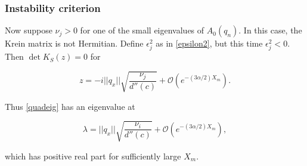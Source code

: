 \documentclass[12pt]{article}
\begin{document}
\subsubsection{Instability criterion}

Now suppose $\nu_j > 0$ for one of the small eigenvalues of $A_0(q_n)$. In this case, the Krein matrix is not Hermitian. Define $\epsilon_j^2$ as in \eqref{epsilon2}, but this time $\epsilon_j^2 < 0$. Then $\det K_S(z) = 0$ for 

\begin{equation}
z = -i ||q_x|| \sqrt{ \frac{ \nu_j}{d''(c)} } + \mathcal{O}(e^{-(3 \alpha/2) X_m}).
\end{equation}

Thus \eqref{quadeig} has an eigenvalue at

\begin{equation}
\lambda = ||q_x|| \sqrt{ \frac{ \nu_i}{d''(c)} } + \mathcal{O}(e^{-(3 \alpha/2) X_m}),
\end{equation}

which has positive real part for sufficiently large $X_m$. 



\end{document}
